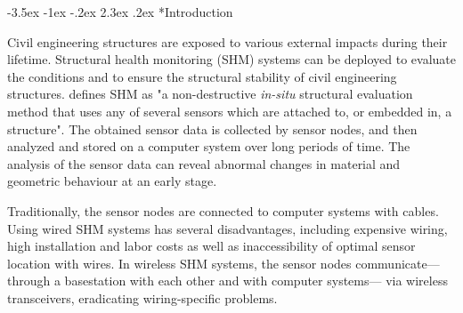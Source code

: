\documentclass[12pt,a4paper]{scrartcl}
\makeatletter
\renewcommand\section{\@startsection{section}{1}{\z@}%
                     {-3.5ex \@plus -1ex \@minus -.2ex}%
                     {2.3ex \@plus.2ex}%
                     {\normalfont\large\bfseries}}
\makeatother
\begin{document}
\linenumbers %
\modulolinenumbers[5] %
%
%


\section*{Introduction}

Civil engineering structures are exposed to various external impacts during their lifetime. 
Structural health monitoring (SHM) systems can be deployed to evaluate the conditions and to ensure the structural stability of civil engineering structures.
\citet{BisbySHM} defines SHM as "a non-destructive \textit{in-situ} structural evaluation method that uses any of several sensors which are attached to, or embedded in, a structure".
The obtained sensor data is collected by sensor nodes, and then analyzed and stored on a computer system over long periods of time. 
The analysis of the sensor data can reveal abnormal changes in material and geometric behaviour at an early stage.

Traditionally, the sensor nodes are connected to computer systems with cables.
Using wired SHM systems has several disadvantages, including expensive wiring, high installation and labor costs as well as inaccessibility of optimal sensor location with wires.
In wireless SHM systems, the sensor nodes communicate---through a basestation with each other and with computer systems--- via wireless transceivers, eradicating wiring-specific problems.
\end{document}
